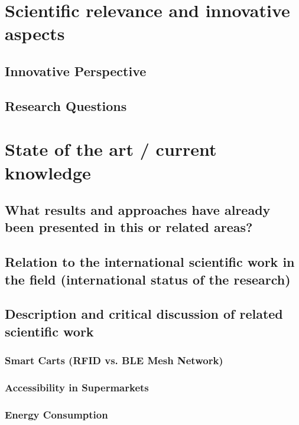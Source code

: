 \documentclass[a4paper,11pt]{article}
\begin{document}
\section{Scientific relevance and innovative aspects}
\label{sect:relevance}

\subsection{Innovative Perspective}



\subsection{Research Questions}

\section{State of the art / current knowledge}
\label{sect:star}

\subsection{What results and approaches have already been presented in this or related areas?}


\subsection{Relation to the international scientific work in the field (international status of the research)}

\subsection{Description and critical discussion of related scientific work}


\subsubsection{Smart Carts (RFID vs. BLE Mesh Network)}

\subsubsection{Accessibility in Supermarkets}

\subsubsection{Energy Consumption}
\end{document}
